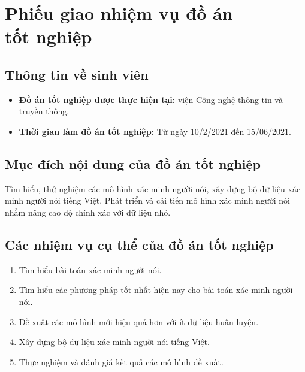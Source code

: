 \documentclass[a4paper, 13pt, oneside]{report}
\begin{document}
\pagebreak
{}
\chapter*{Phiếu giao nhiệm vụ đồ án\\ tốt nghiệp}
\section*{Thông tin về sinh viên}

\begin{itemize}
    \item \textbf{Đồ án tốt nghiệp được thực hiện tại:} viện Công nghệ thông tin và truyền thông.
    \item \textbf{Thời gian làm đồ án tốt nghiệp: } Từ ngày 10/2/2021 đến 15/06/2021.
\end{itemize}
\section*{Mục đích nội dung của đồ án tốt nghiệp}
Tìm hiểu, thử nghiệm các mô hình xác minh người nói, xây dựng bộ dữ liệu xác minh người nói tiếng Việt. Phát triển và cải tiến mô hình xác minh người nói nhằm nâng cao độ chính xác với dữ liệu nhỏ.

\section*{Các nhiệm vụ cụ thể của đồ án tốt nghiệp}
\begin{enumerate}
    \item Tìm hiểu bài toán xác minh người nói. 
    \item Tìm hiểu các phương pháp tốt nhất hiện nay cho bài toán xác minh người nói.
    \item Đề xuất các mô hình mới hiệu quả hơn với ít dữ liệu huấn luyện.
    \item Xây dựng bộ dữ liệu xác minh người nói tiếng Việt.
    \item Thực nghiệm và đánh giá kết quả các mô hình đề xuất.
\end{enumerate}
\end{document}
